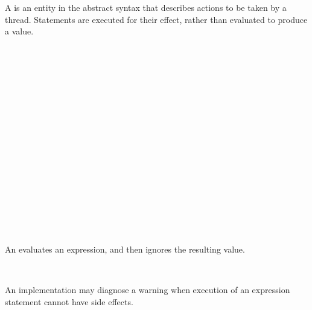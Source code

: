 
A  is an entity in the abstract syntax that describes actions to be taken by a thread.
Statements are executed for their effect, rather than evaluated to produce a value.

\begin{Syntax}
	 \\
		 \\
		\SynOr {} \\
		\SynOr {} \\
		\SynOr {} \\
		\SynOr {} \\
		\SynOr {} \\
		\SynOr {} \\
		\SynOr {} \\
		\SynOr {} \\
		\SynOr {} \\
		\SynOr {} \\
		\SynOr {} \\
		\SynOr {} \\
		\SynOr {} \\
		\SynOr {} \\
\end{Syntax}


\begin{Description}
An  evaluates an expression, and then ignores the resulting value.
\end{Description}

\begin{Syntax}
	 \\
		 \code{;}
\end{Syntax}

\begin{Checking}
\DerivationRule{
	\SynthExpr{\ContextVarA}{\ExprVarE}{\TypeVarT}{\ContextVarB}
}{
	\CheckStmt{\ContextVarA}{\ExprVarE \code{;}}{\ContextVarB}
}
\end{Checking}

An implementation may diagnose a warning when execution of an expression statement cannot have side effects.

